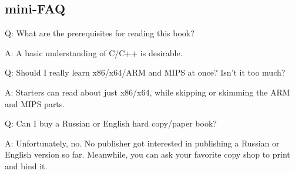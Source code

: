 \subsection*{mini-FAQ}






\par Q: What are the prerequisites for reading this book?
\par A: A basic understanding of C/C++ is desirable.


\par Q: Should I really learn x86/x64/ARM and MIPS at once? Isn't it too much?
\par A: Starters can read about just x86/x64, while skipping or skimming the ARM and MIPS parts.



\par Q: Can I buy a Russian or English hard copy/paper book?
\par A: Unfortunately, no. No publisher got interested in publishing a Russian or English version so far.
Meanwhile, you can ask your favorite copy shop to print and bind it.

